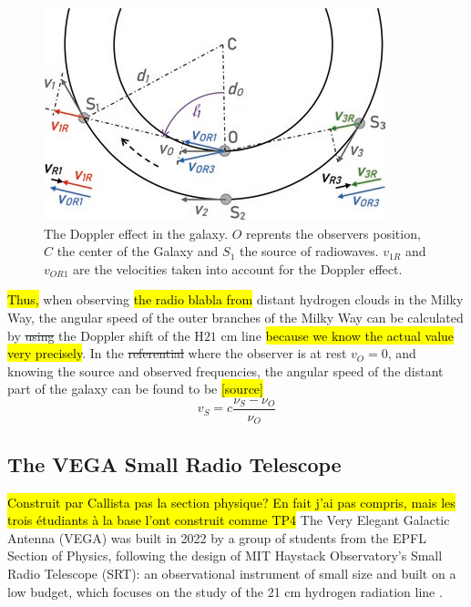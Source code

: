 \begin{figure}[htbp]
    \centering
    \includegraphics[width=0.7\linewidth]{figures/doppler_galaxy.png}
    \caption{The Doppler effect in the galaxy. $O$ reprents the observers position, $C$ the center of the Galaxy and $S_1$ the source of radiowaves. $v_{1R}$ and $v_{OR1}$ are the velocities taken into account for the Doppler effect. \cite{lauterbach_radio_2022}}
    \label{fig:doppler_galaxy}
\end{figure}

\hl{Thus, }when observing \hl{the radio blabla from} distant hydrogen clouds in the Milky Way, the angular speed of the outer branches of the Milky Way can be calculated by \st{using} the Doppler shift of the H$21$ cm line \hl{because we know the actual value very precisely}.
In the \st{referential} where the observer is at rest $v_O = 0$, and knowing the source and observed frequencies, the angular speed of the distant part of the galaxy can be found to be \hl{[source]}
\begin{equation}
    v_S = c \frac{\nu_S - \nu_O}{\nu_O}
    \label{eq:doppler}
\end{equation}

\subsection{The VEGA Small Radio Telescope}
\hl{Construit par Callista pas la section physique? En fait j'ai pas compris, mais les trois étudiants à la base l'ont construit comme TP4}
The Very Elegant Galactic Antenna (VEGA) was built in 2022 by a group of students from the EPFL Section of Physics, following the design of MIT Haystack Observatory's Small Radio Telescope (SRT): an observational instrument of small size and built on a low budget, which focuses on the study of the 21 cm hydrogen radiation line \cite{interdisciplinary_project_2022}.

